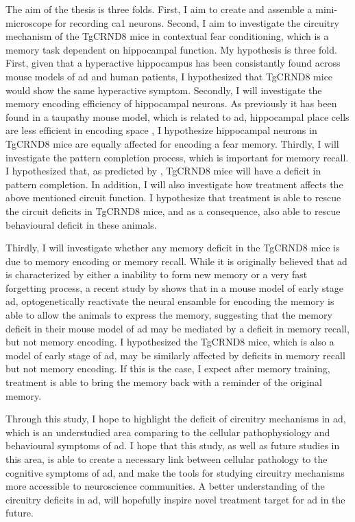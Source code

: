 The aim of the thesis is three folds. First, I aim to create and assemble a mini-microscope for recording \gls{ca1} neurons. Second, I aim to investigate the circuitry mechanism of the TgCRND8 mice in contextual fear conditioning, which is a memory task dependent on hippocampal function. My hypothesis is three fold. First, given that a hyperactive hippocampus has been consistantly found across mouse models of \gls{ad} and human patients, I hypothesized that TgCRND8 mice would show the same hyperactive symptom. Secondly, I will investigate the memory encoding efficiency of hippocampal neurons. As previously it has been found in a taupathy mouse model, which is related to \gls{ad}, hippocampal place cells are less efficient in encoding space \citep{cheng13, ciupek15}, I hypothesize hippocampal neurons in TgCRND8 mice are equally affected for encoding a fear memory. Thirdly, I will investigate the pattern completion process, which is important for memory recall. I hypothesized that, as predicted by \citet{horn93}, TgCRND8 mice will have a deficit in pattern completion. In addition, I will also investigate how \tglu treatment affects the above mentioned circuit function. I hypothesize that \tglu treatment is able to rescue the circuit deficits in TgCRND8 mice, and as a consequence, also able to rescue behavioural deficit in these animals. 

Thirdly, I will investigate whether any memory deficit in the TgCRND8 mice is due to memory encoding or memory recall. While it is originally believed that \gls{ad} is characterized by either a inability to form new memory or a very fast forgetting process, a recent study by \citet{roy16} shows that in a mouse model of early stage \gls{ad}, optogenetically reactivate the neural ensamble for encoding the memory is able to allow the animals to express the memory, suggesting that the memory deficit in their mouse model of \gls{ad} may be mediated by a deficit in memory recall, but not memory encoding. I hypothesized the TgCRND8 mice, which is also a model of early stage of \gls{ad}, may be similarly affected by deficits in memory recall but not memory encoding. If this is the case, I expect after memory training, \tglu treatment is able to bring the memory back with a reminder of the original memory.

Through this study, I hope to highlight the deficit of circuitry mechanisms in \gls{ad}, which is an understudied area comparing to the cellular pathophysiology and behavioural symptoms of \gls{ad}. I hope that this study, as well as future studies in this area, is able to create a necessary link between cellular pathology to the cognitive symptoms of \gls{ad}, and make the tools for studying circuitry mechanisms more accessible to neuroscience communities. A better understanding of the circuitry deficits in \gls{ad}, will hopefully inspire novel treatment target for \gls{ad} in the future. 
